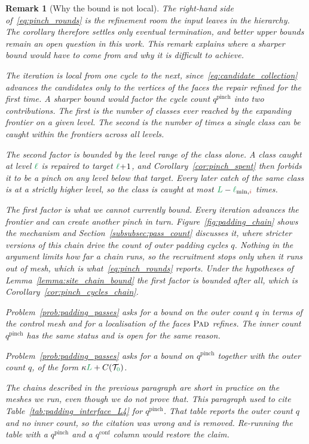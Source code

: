 \documentclass[a4paper, 12pt]{article}
\newcommand{\robert}[1]{{\color{orange} #1}}
\newcommand{\lminIdx}[1]{\l_{\min,#1}}
\newcommand{\guidance}[1]{{\color{lime!70!black} #1}}
\newcommand{\green}{\color{ForestGreen}}
\newcommand{\brickred}{\color{BrickRed}}
\newcommand{\T}{\mathcal{T}}
\newcommand{\coarseIdxone}{{\brickred i}}
\renewcommand{\l}{{\green\ell}}
\renewcommand{\L}{{\green L}}
\newcommand{\lzero}{{\green 0}}
\newtheorem{remark}[theorem]{Remark}
\theoremstyle{definition}
\theoremstyle{plain}
\numberwithin{equation}{section}
\newcommand{\tobecut}[1]{{\color{red} #1}}     %
\begin{document}
\begin{remark}[Why the bound is not local]
    \label{rem:pinch_rounds_bound}
    The right-hand side of~\eqref{eq:pinch_rounds} is the refinement room the input leaves in the hierarchy. The corollary therefore settles only eventual termination, and better upper bounds remain an open question in this work. This remark explains where a sharper bound would have to come from and why it is difficult to achieve.

    The iteration is local from one cycle to the next, since~\eqref{eq:candidate_collection} advances the candidates only to the vertices of the faces the repair refined for the first time.
    A sharper bound would factor the cycle count $q^{\mathrm{pinch}}$ into two contributions. The first is the number of classes ever reached by the expanding frontier on a given level. The second is the number of times a single class can be caught within the frontiers across all levels.

    The second factor is bounded by the level range of the class alone. A class caught at level $\l$ is repaired to target $\l \! + \! 1$, and Corollary~\ref{cor:pinch_spent} then forbids it to be a pinch on any level below that target. Every later catch of the same class is at a strictly higher level, so the class is caught at most $\L - \lminIdx{\coarseIdxone}$ times.

    The first factor is what we cannot currently bound. Every iteration advances the frontier and can create another pinch in turn. Figure~\ref{fig:padding_chain} shows the mechanism and Section~\ref{subsubsec:pass_count} discusses it, where stricter versions of this chain drive the count of outer padding cycles $q$. Nothing in the argument limits how far a chain runs, so the recruitment stops only when it runs out of mesh, which is what~\eqref{eq:pinch_rounds} reports. \robert{Under the hypotheses of Lemma~\ref{lemma:site_chain_bound} the first factor is bounded after all, which is Corollary~\ref{cor:pinch_cycles_chain}.}

    \tobecut{Problem~\ref{prob:padding_passes} asks for a bound on the outer count $q$ in terms of the control mesh and for a localisation of the faces $\textsc{Pad}$ refines. The inner count $q^{\mathrm{pinch}}$ has the same status and is open for the same reason.}

    \robert{Problem~\ref{prob:padding_passes} asks for a bound on $q^{\mathrm{pinch}}$ together with the outer count $q$, of the form $\kappa \L + C(\T_\lzero)$.}

\robert{The chains described in the previous paragraph are short in practice on the meshes we run, even though we do not prove that.} \guidance{This paragraph used to cite Table~\ref{tab:padding_interface_L4} for $q^{\mathrm{pinch}}$. That table reports the outer count $q$ and no inner count, so the citation was wrong and is removed. Re-running the table with a $q^{\mathrm{pinch}}$ and a $q^{\mathrm{conf}}$ column would restore the claim.}
\end{remark}
\end{document}
